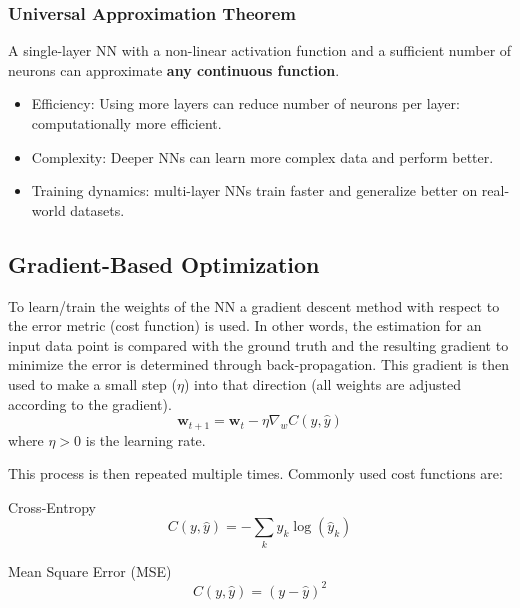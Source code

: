 \subsubsection{Universal Approximation Theorem}
A single-layer NN with a non-linear activation function and a sufficient number of neurons can approximate \textbf{any continuous function}.
\newpar{}
\begin{itemize}
    \item Efficiency: Using more layers can reduce number of neurons per layer: computationally more efficient.
    \item Complexity: Deeper NNs can learn more complex data and perform better. %
    \item Training dynamics: multi-layer NNs train faster and generalize better on real-world datasets.
\end{itemize}

\renewcommand{\arraystretch}{1}
\setlength\tabcolsep{\oldtabcolsep}

\subsection{Gradient-Based Optimization}

To learn/train the weights of the NN a gradient descent method with respect to the error metric (cost function) is used. In other words, the estimation for an input data point is compared with the ground truth and the resulting gradient to minimize the error is determined through back-propagation. This gradient is then used to make a small step ($\eta$) into that direction (all weights are adjusted according to the gradient).
\begin{equation*}
    \mathbf{w}_{t+1} = \mathbf{w}_t - \eta \nabla_w C(y,\hat{y})
\end{equation*}
where $\eta > 0$ is the learning rate.

This process is then repeated multiple times.
\newpar{}
Commonly used cost functions are:

Cross-Entropy
\begin{equation*}
    C(y,\hat{y}) = - \sum_{k}y_k\log(\hat{y}_k)
\end{equation*}

Mean Square Error (MSE)
\begin{equation*}
    C(y,\hat{y}) = {(y - \hat{y})}^2
\end{equation*}

